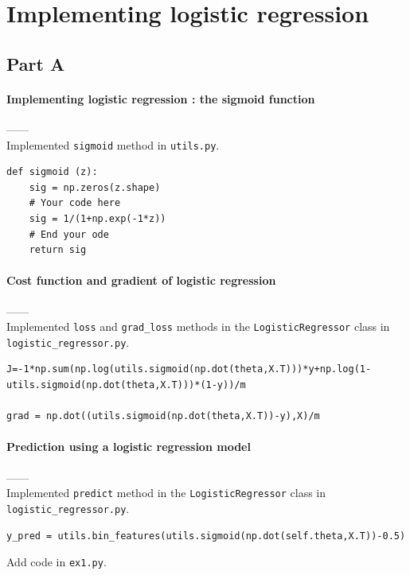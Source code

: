 \documentclass{article}
\begin{document}
\section{Implementing logistic regression}
\subsection{Part A}
\paragraph{Implementing logistic regression : the sigmoid function\\}
------\\
Implemented \verb|sigmoid| method in \verb|utils.py|.
\begin{tiny}
\begin{lstlisting}
def sigmoid (z):
    sig = np.zeros(z.shape)
    # Your code here
    sig = 1/(1+np.exp(-1*z))
    # End your ode
    return sig

\end{lstlisting}
\end{tiny}

\paragraph{Cost function and gradient of logistic regression\\}
------\\
Implemented  \verb|loss| and  \verb|grad_loss| methods in the  \verb|LogisticRegressor| class in   \verb|logistic_regressor.py|.
\begin{tiny}
\begin{lstlisting}
J=-1*np.sum(np.log(utils.sigmoid(np.dot(theta,X.T)))*y+np.log(1-utils.sigmoid(np.dot(theta,X.T)))*(1-y))/m

grad = np.dot((utils.sigmoid(np.dot(theta,X.T))-y),X)/m

\end{lstlisting}
\end{tiny}
\paragraph{Prediction using a logistic regression model\\}
------\\
Implemented \verb|predict| method in the  \verb|LogisticRegressor| class in \verb|logistic_regressor.py|.

\begin{tiny}
\begin{lstlisting}
y_pred = utils.bin_features(utils.sigmoid(np.dot(self.theta,X.T))-0.5)
\end{lstlisting}
\end{tiny}
Add code in \verb|ex1.py|.
\end{document}
